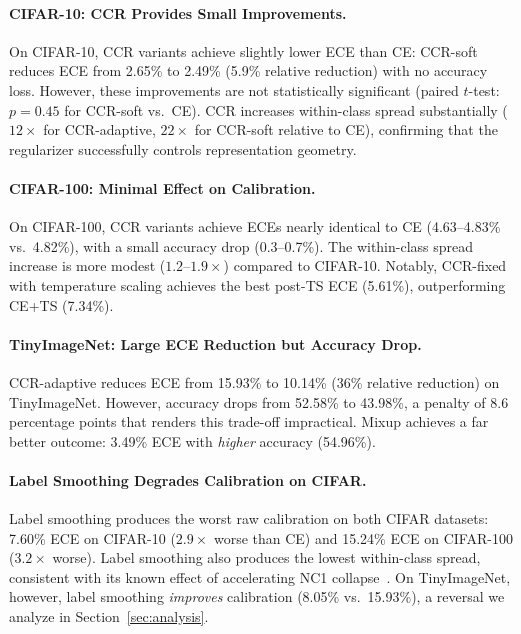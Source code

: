\documentclass{article}
\begin{document}
\paragraph{CIFAR-10: CCR Provides Small Improvements.}
On CIFAR-10, CCR variants achieve slightly lower ECE than CE: CCR-soft reduces ECE from 2.65\% to 2.49\% (5.9\% relative reduction) with no accuracy loss. However, these improvements are not statistically significant (paired $t$-test: $p = 0.45$ for CCR-soft vs.\ CE). CCR increases within-class spread substantially ($12\times$ for CCR-adaptive, $22\times$ for CCR-soft relative to CE), confirming that the regularizer successfully controls representation geometry.

\paragraph{CIFAR-100: Minimal Effect on Calibration.}
On CIFAR-100, CCR variants achieve ECEs nearly identical to CE (4.63--4.83\% vs.\ 4.82\%), with a small accuracy drop (0.3--0.7\%). The within-class spread increase is more modest ($1.2$--$1.9\times$) compared to CIFAR-10. Notably, CCR-fixed with temperature scaling achieves the best post-TS ECE (5.61\%), outperforming CE+TS (7.34\%).

\paragraph{TinyImageNet: Large ECE Reduction but Accuracy Drop.}
CCR-adaptive reduces ECE from 15.93\% to 10.14\% (36\% relative reduction) on TinyImageNet. However, accuracy drops from 52.58\% to 43.98\%, a penalty of 8.6 percentage points that renders this trade-off impractical. Mixup achieves a far better outcome: 3.49\% ECE with \emph{higher} accuracy (54.96\%).

\paragraph{Label Smoothing Degrades Calibration on CIFAR.}
Label smoothing produces the worst raw calibration on both CIFAR datasets: 7.60\% ECE on CIFAR-10 ($2.9\times$ worse than CE) and 15.24\% ECE on CIFAR-100 ($3.2\times$ worse). Label smoothing also produces the lowest within-class spread, consistent with its known effect of accelerating NC1 collapse~\citep{guo2025cross}. On TinyImageNet, however, label smoothing \emph{improves} calibration (8.05\% vs.\ 15.93\%), a reversal we analyze in Section~\ref{sec:analysis}.
\end{document}
